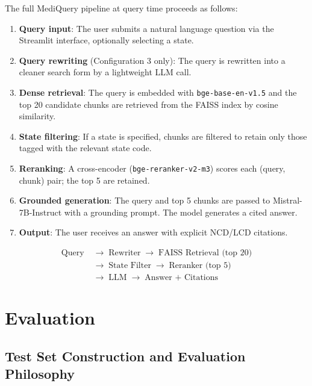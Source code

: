 \documentclass[10pt, letterpaper]{article}
\begin{document}
The full MediQuery pipeline at query time proceeds as follows:

\begin{enumerate}[noitemsep, topsep=4pt]
    \item \textbf{Query input}: The user submits a natural language question via the
          Streamlit interface, optionally selecting a state.
    \item \textbf{Query rewriting} (Configuration 3 only): The query is rewritten
          into a cleaner search form by a lightweight LLM call.
    \item \textbf{Dense retrieval}: The query is embedded with \texttt{bge-base-en-v1.5}
          and the top 20 candidate chunks are retrieved from the FAISS index by cosine
          similarity.
    \item \textbf{State filtering}: If a state is specified, chunks are filtered to
          retain only those tagged with the relevant state code.
    \item \textbf{Reranking}: A cross-encoder (\texttt{bge-reranker-v2-m3}) scores
          each (query, chunk) pair; the top 5 are retained.
    \item \textbf{Grounded generation}: The query and top 5 chunks are passed to
          Mistral-7B-Instruct with a grounding prompt. The model generates a cited answer.
    \item \textbf{Output}: The user receives an answer with explicit NCD/LCD citations.
\end{enumerate}
\[
\begin{aligned}
\text{Query} &\;\rightarrow\; \text{Rewriter}
\;\rightarrow\; \text{FAISS Retrieval (top 20)} \\
&\;\rightarrow\; \text{State Filter}
\;\rightarrow\; \text{Reranker (top 5)} \\
&\;\rightarrow\; \text{LLM}
\;\rightarrow\; \text{Answer + Citations}
\end{aligned}
\]


\newpage

\section{Evaluation}

\subsection{Test Set Construction and Evaluation Philosophy}
\end{document}

